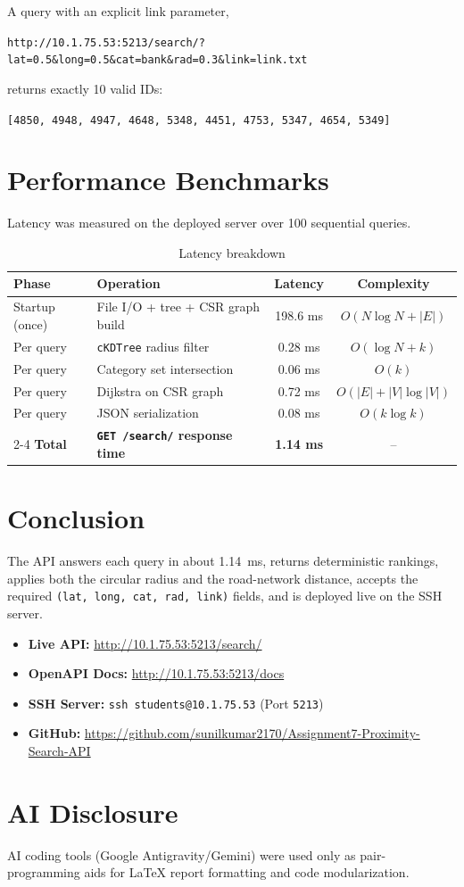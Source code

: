\documentclass[11pt,a4paper]{article}
\begin{document}
A query with an explicit link parameter,
\begin{center}
\small\texttt{http://10.1.75.53:5213/search/?lat=0.5\&long=0.5\&cat=bank\&rad=0.3\&link=link.txt}
\end{center}
returns exactly 10 valid IDs:
\begin{center}
\texttt{[4850, 4948, 4947, 4648, 5348, 4451, 4753, 5347, 4654, 5349]}
\end{center}

\section{Performance Benchmarks}
Latency was measured on the deployed server over 100 sequential queries.
\begin{table}[!htb]
\centering
\small
\caption{Latency breakdown}
\begin{tabular}{@{}llcc@{}}
\toprule
\textbf{Phase} & \textbf{Operation} & \textbf{Latency} & \textbf{Complexity} \\ \midrule
Startup (once) & File I/O + tree + CSR graph build & 198.6 ms & $O(N \log N + |E|)$ \\ \midrule
Per query & \texttt{cKDTree} radius filter & 0.28 ms & $O(\log N + k)$ \\
Per query & Category set intersection & 0.06 ms & $O(k)$ \\
Per query & Dijkstra on CSR graph & 0.72 ms & $O(|E| + |V|\log|V|)$ \\
Per query & JSON serialization & 0.08 ms & $O(k\log k)$ \\ \cmidrule{2-4}
\textbf{Total} & \textbf{\texttt{GET /search/} response time} & \textbf{1.14 ms} & -- \\ \bottomrule
\end{tabular}
\end{table}

\section{Conclusion}
The API answers each query in about 1.14~ms, returns deterministic rankings, applies both the circular radius and the road-network distance, accepts the required \texttt{(lat, long, cat, rad, link)} fields, and is deployed live on the SSH server.

\begin{itemize}[itemsep=1pt, topsep=2pt]
    \item \textbf{Live API:} \url{http://10.1.75.53:5213/search/}
    \item \textbf{OpenAPI Docs:} \url{http://10.1.75.53:5213/docs}
    \item \textbf{SSH Server:} \texttt{ssh students@10.1.75.53} \quad (Port \texttt{5213})
    \item \textbf{GitHub:} \url{https://github.com/sunilkumar2170/Assignment7-Proximity-Search-API}
\end{itemize}

\section*{AI Disclosure}
AI coding tools (Google Antigravity/Gemini) were used only as pair-programming aids for LaTeX report formatting and code modularization.
\end{document}
